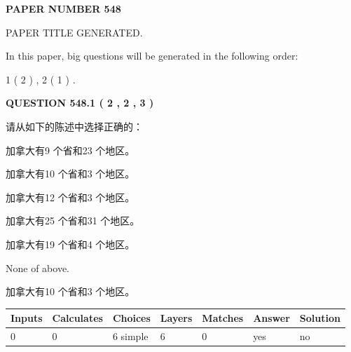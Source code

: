 \documentclass{ctexart}
\begin{document}
   
 {\textbf{ \Large{ PAPER NUMBER  548  }}}
   
   
\vspace{0.2in}
   
   
   
   
   
   
   
   
 \vspace{0.2in}
 
 
 
 
   
   
 PAPER TITLE GENERATED.
   
   
   
\vspace{0.2in}
   
In this paper, big questions will be generated in the following order: 
   
   
   1 ( 2 )
 ,
   2 ( 1 )
 .
  
\vspace{0.2in}
  
{\textbf{\Large{QUESTION
548.1 
 ( 2 , 2 , 3 )
}}}
  
  
请从如下的陈述中选择正确的：
 
 
加拿大有9 个省和23 个地区。
 
 
加拿大有10 个省和3 个地区。
 
 
加拿大有12 个省和3 个地区。
 
 
加拿大有25 个省和31 个地区。
 
 
加拿大有19 个省和4 个地区。
 
 
 None of above.
 
 
\noindent{}
 
 
加拿大有10 个省和3 个地区。
 
 
\noindent{}
 
 
   
   
   
   
\noindent\begin{tabular}{|l|l|l|l|l|l|l|}
 \hline
Inputs & Calculates & Choices & Layers & Matches & Answer & Solution \\ \hline
 0  & 
 0  & 
 6
  simple  
  & 
 6  & 
 0  & 
  yes & 
  no 
  \\ \hline
 \end{tabular}
   
\end{document}

